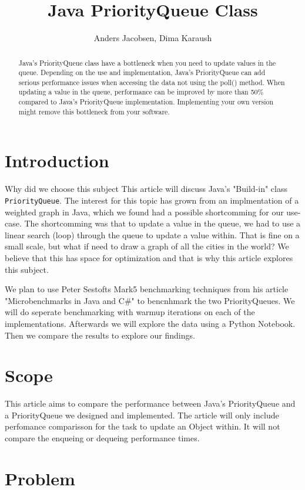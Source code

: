 \documentclass{article}
\title{Java PriorityQueue Class}
\author{Anders Jacobsen, Dima Karaush}
\begin{document}
\maketitle

\begin{abstract}
    Java's PriorityQueue class have a bottleneck when you need to update values in the queue.
    Depending on the use and implementation, Java's PriorityQueue can add serious performance 
    issues when accessing the data not using the poll() method.
    When updating a value in the queue, performance can be improved by more than 50\% compared 
    to Java's PriorityQueue implementation. Implementing your own version might remove this 
    bottleneck from your software. 
\end{abstract}

\section{Introduction}
Why did we choose this subject
This article will discuss Java's "Build-in" class \lstinline!PriorityQueue!. 
The interest for this topic has grown from an implmentation of a weighted graph 
in Java, which we found had a possible shortcomming for our use-case. The shortcomming was that to update
a value in the queue, we had to use a linear search (loop) through the queue to update 
a value within. That is fine on a small scale, but what if need to draw a graph of all the cities in the world? 
We believe that this has space for optimization and that is why this article explores this subject.  

We plan to use Peter Sestofts Mark5 benchmarking techniques from his article 
"Microbenchmarks in Java and C\#" \cite{microbenchmarks} to bencnhmark the two 
PriorityQueues. We will do seperate benchmarking with warmup iterations on 
each of the implementations. Afterwards we will explore the data using a Python
Notebook. Then we compare the results to explore our findings. 


\section{Scope}
This article aims to compare the performance between Java's PriorityQueue
and a PriorityQueue we designed and implemented. The article will only include 
perfomance comparisson for the task to update an Object within. It will not 
compare the enqueing or dequeing performance times.

\section{Problem}
\end{document}
